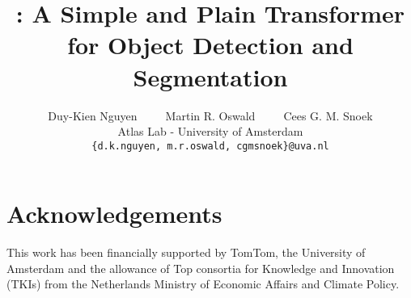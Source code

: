 \documentclass[10pt,twocolumn,letterpaper]{article}
\title{\ours: A Simple and Plain Transformer for Object Detection and Segmentation}
\author{Duy-Kien Nguyen~~~~~Martin R. Oswald~~~~~Cees G. M. Snoek \\
{\normalsize Atlas Lab - University of Amsterdam}\\
{\tt\small \{d.k.nguyen, m.r.oswald, cgmsnoek\}@uva.nl}
}
\begin{document}
\maketitle









\section*{Acknowledgements}

This work has been financially supported by TomTom, the University of Amsterdam and the allowance of Top consortia for Knowledge and Innovation (TKIs) from the Netherlands Ministry of Economic Affairs and Climate Policy.


\appendix

% 





{
    \small
    
    
}

% 
\end{document}
